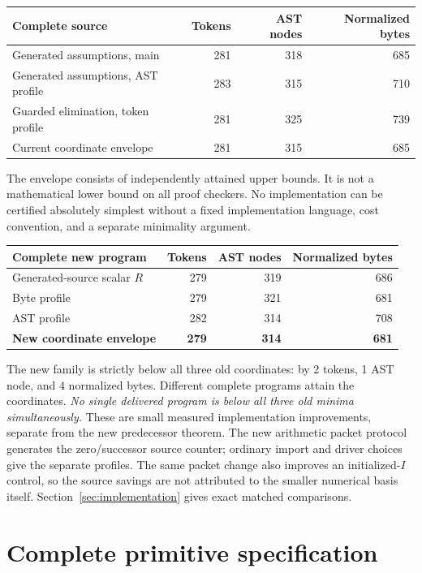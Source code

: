 \documentclass[11pt,letterpaper]{article}
\theoremstyle{definition}\newtheorem{definition}[theorem]{Definition}
\theoremstyle{remark}\newtheorem{remark}[theorem]{Remark}
\begin{document}
\begin{center}
\begin{tabular}{lrrr}
\toprule
Complete source & Tokens & AST nodes & Normalized bytes\\
\midrule
Generated assumptions, main &281&318&685\\
Generated assumptions, AST profile &283&315&710\\
Guarded elimination, token profile &281&325&739\\
\midrule
Current coordinate envelope &281&315&685\\
\bottomrule
\end{tabular}
\end{center}
The envelope consists of independently attained upper bounds. It is not
a mathematical lower bound on all proof checkers. No implementation can
be certified absolutely simplest without a fixed implementation language,
cost convention, and a separate minimality argument.
\begin{center}\small
\begin{tabular}{lrrr}
\toprule
Complete new program & Tokens & AST nodes & Normalized bytes\\
\midrule
Generated-source scalar $R$ &279&319&686\\
Byte profile &279&321&681\\
AST profile &282&314&708\\
\midrule
\textbf{New coordinate envelope} &\textbf{279}&\textbf{314}&\textbf{681}\\
\bottomrule
\end{tabular}
\end{center}

The new family is strictly below all three old coordinates: by 2 tokens,
1 AST node, and 4 normalized bytes. Different complete programs attain
the coordinates. \emph{No single delivered program is below all three
old minima simultaneously.} These are small measured implementation
improvements, separate from the new predecessor theorem. The new
arithmetic packet protocol generates the zero/successor source counter;
ordinary import and driver choices give the separate profiles.
The same packet change also improves an initialized-$I$ control, so the
source savings are not attributed to the smaller numerical basis itself.
Section~\ref{sec:implementation} gives exact matched comparisons.


\section{Complete primitive specification}\label{sec:spec}
\end{document}
